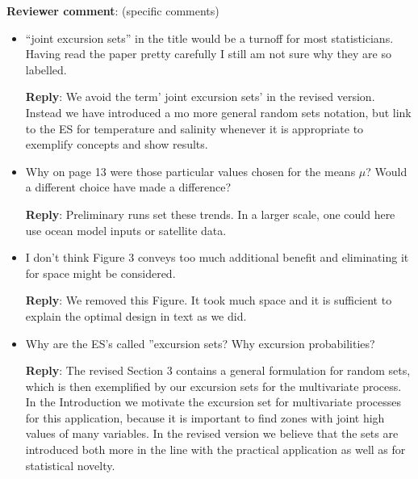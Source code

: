 \documentclass[a4paper]{article}
\def\revcom{\textbf{Reviewer comment}}
\def\reply{\textbf{Reply}}
\begin{document}
\begin{answers}
\item{\revcom : (specific comments)}\label{q11}


\begin{itemize}[noitemsep,topsep=0pt,parsep=0pt,partopsep=0pt]

\item “joint excursion sets” in the title would be a turnoff for most statisticians. Having read the paper pretty carefully I still am not sure why they are so labelled.\par
\reply: We avoid the term' joint excursion sets' in the revised version. Instead we have introduced a mo more general random sets notation, but link to the ES for temperature and salinity whenever it is appropriate to exemplify concepts and show results.

\vspace{1em}

\item Why on page 13 were those particular values chosen for the means $\mu$? Would a different choice have made a difference?\par

\reply: Preliminary runs set these trends. In a larger scale, one could here use ocean model inputs or satellite data. 

\vspace{1em}

\item I don’t think Figure 3 conveys too much additional benefit and eliminating it for space might be considered.\par

\reply: We removed this Figure. It took much space and it is sufficient to explain the optimal design in text as we did. 
\vspace{1em}

\item Why are the ES’s called ”excursion sets? Why excursion probabilities?\par

\reply: The revised Section 3 contains a general formulation for random sets, which is then exemplified by our excursion sets for the multivariate process. In the Introduction we motivate the excursion set for multivariate processes for this application, because it is important to find zones with joint high values of many variables. In the revised version we believe that the sets are introduced both more in the line with the practical application as well as for statistical novelty.
\vspace{1em}


\end{itemize}
\end{answers}
\end{document}
